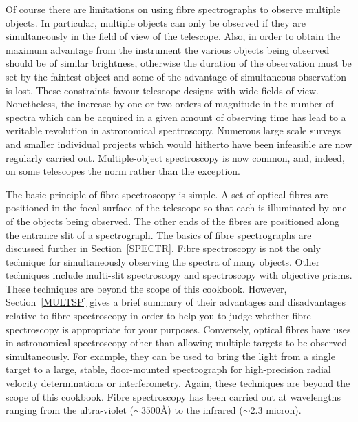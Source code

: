 \documentclass[twoside,11pt]{starlink}
\begin{document}
Of course there are limitations on using fibre spectrographs to observe
multiple objects.  In particular, multiple objects can only be observed if
they are simultaneously in the field of view of the telescope.  Also, in
order to obtain the maximum advantage from the instrument the various
objects being observed should be of similar brightness, otherwise the
duration of the observation must be set by the faintest object and some
of the advantage of simultaneous observation is lost.  These constraints
favour telescope designs with wide fields of view.  Nonetheless, the
increase by one or two orders of magnitude in the number of spectra which
can be acquired in a given amount of observing time has lead to a
veritable revolution in astronomical spectroscopy.  Numerous large scale
surveys and smaller individual projects which would hitherto have been
infeasible are now regularly carried out.  Multiple-object spectroscopy
is now common, and, indeed, on some telescopes the norm rather than the
exception.

The basic principle of fibre spectroscopy is simple.  A set of optical
fibres are positioned in the focal surface of the telescope so that
each is illuminated by one of the objects being observed.  The other
ends of the fibres are positioned along the entrance slit of a
spectrograph.  The basics of fibre spectrographs are discussed further in
Section~\ref{SPECTR}.  Fibre spectroscopy is not the only technique for
simultaneously observing the spectra of many objects.  Other techniques
include multi-slit spectroscopy and spectroscopy with objective prisms.
These techniques are beyond the scope of this cookbook.  However,
Section~\ref{MULTSP} gives a brief summary of their advantages and
disadvantages relative to fibre spectroscopy in order to help you to
judge whether fibre spectroscopy is appropriate for your purposes.
Conversely, optical fibres have uses in astronomical spectroscopy other
than allowing multiple targets to be observed simultaneously.  For
example, they can be used to bring the light from a single target to a
large, stable, floor-mounted spectrograph for high-precision radial
velocity determinations or interferometry.  Again, these techniques are
beyond the scope of this cookbook.  Fibre spectroscopy has been carried
out at wavelengths ranging from the ultra-violet ($\sim 3500$\AA) to
the infrared ($\sim 2.3$ micron).
\end{document}
